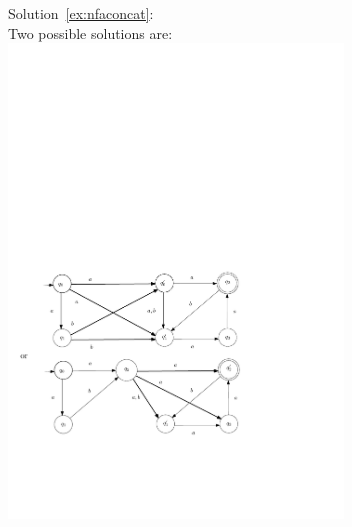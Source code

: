 \medskip
\begin{samepage}
\noindent Solution~\ref{ex:nfaconcat}:\\
Two possible solutions are:\\
\includegraphics[width=3.5in]{figs/NFAforConcatAns}
\end{samepage}

\fi %

